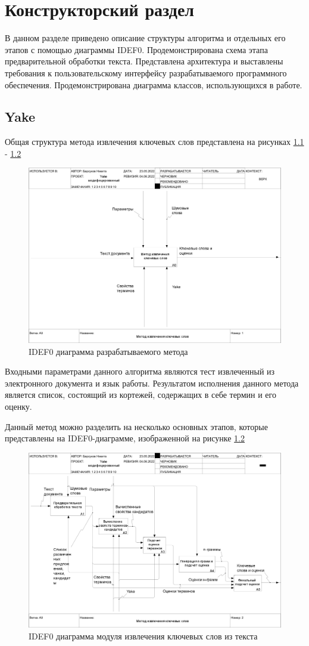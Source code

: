 \chapter{Конструкторский раздел}
В данном разделе приведено описание структуры алгоритма и отдельных его этапов с помощью диаграммы IDEF0.
Продемонстрирована схема этапа предварительной обработки текста.
Представлена архитектура и выставлены требования к пользовательскому интерфейсу разрабатываемого программного обеспечения.
Продемонстрирована диаграмма классов, использующихся в работе.

\section{Yake}
Общая структура метода извлечения ключевых слов представлена на рисунках \ref{fig:01a0} - \ref{fig:02a0}
\begin{figure}[!h]
	\centering
	\includegraphics[width=0.7\linewidth]{src/img/idef0/Yake/01_A0}
	\caption{IDEF0 диаграмма разрабатываемого метода}
	\label{fig:01a0}
\end{figure}
Входными параметрами данного алгоритма являются тест извлеченный из электронного документа и язык работы.
Результатом исполнения данного метода является список, состоящий из кортежей, содержащих в себе термин и его оценку.

Данный метод можно разделить на несколько основных этапов, которые представлены на IDEF0-диаграмме, изображенной на рисунке \ref{fig:02a0}
\begin{figure}[!h]
	\centering
	\includegraphics[width=0.7\linewidth]{src/img/idef0/Yake/02_A0}
	\caption{IDEF0 диаграмма модуля извлечения ключевых слов из текста}
	\label{fig:02a0}
\end{figure}

